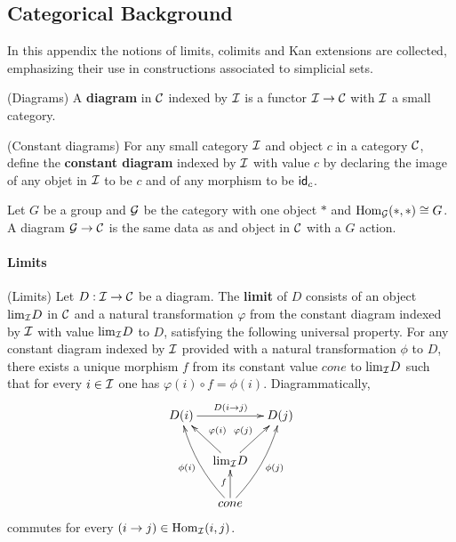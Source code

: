 \documentclass[thesis.tex]{subfiles}
\begin{document}
\subsection{Categorical Background}

In this appendix the notions of limits, colimits and Kan extensions are collected, emphasizing their use in constructions associated to simplicial sets.

\begin{definition} (Diagrams)
A \textbf{diagram} in $\operatorname{\mathcal{C}}$ indexed by $\operatorname{\mathcal{I}}$ is a functor $\operatorname{\mathcal{I}}\to\operatorname{\mathcal{C}}$ with $\operatorname{\mathcal{I}}$ a small category.
\end{definition}

\begin{example}(Constant diagrams)
For any small category $\operatorname{\mathcal{I}}$ and object $c$ in a category $\operatorname{\mathcal{C}}$, define the \textbf{constant diagram} indexed by $\operatorname{\mathcal{I}}$ with value $c$ by declaring the image of any objet in $\operatorname{\mathcal{I}}$ to be $c$ and of any morphism to be $\mathsf{id}_c$.
\end{example}

\begin{example} \label{group as category}
Let $G$ be a group and $\operatorname{\mathcal{G}}$ be the category with one object $\ast$ and $\mathrm{Hom}_{\operatorname{\mathcal{G}}}(\ast,\ast)\cong G$. A diagram $\operatorname{\mathcal{G}}\to\operatorname{\mathcal{C}}$ is the same data as and object in $\operatorname{\mathcal{C}}$ with a $G$ action.
\end{example}

\paragraph{Limits}

\begin{definition} (Limits)
Let $D:\operatorname{\mathcal{I}}\to\operatorname{\mathcal{C}}$ be a diagram. The \textbf{limit} of $D$ consists of an object $\mathrm{lim}_{\operatorname{\mathcal{I}}} D$ in $\operatorname{\mathcal{C}}$ and a natural transformation $\varphi$ from the constant diagram indexed by $\operatorname{\mathcal{I}}$ with value $\mathrm{lim}_{\operatorname{\mathcal{I}}} D$ to $D$, satisfying the following universal property. For any constant diagram indexed by $\operatorname{\mathcal{I}}$ provided with a natural transformation $\phi$ to $D$, there exists a unique morphism $f$ from its constant value $cone$ to $\mathrm{lim}_{\operatorname{\mathcal{I}}} D$ such that for every $i\in\operatorname{\mathcal{I}}$ one has $\varphi(i)\circ f=\phi(i)$. Diagrammatically,
$$\xymatrix@C=.8pc @R=1.8pc{D(i)\ar[rr]^{D(i\to j)}& &D(j)\\ &\ar[lu]_{\varphi(i)}\lim_{\I} D\ar[ru]^{\varphi(j)} & \\ & \ar@/^/[luu]^{\phi(i)}cone\ar^f[u]\ar@/_/[ruu]_{\phi(j)} &}$$
commutes for every $(i\to j)\in\mathrm{Hom}_{\operatorname{\mathcal{I}}}(i,j)$.
\end{definition}
\end{document}
